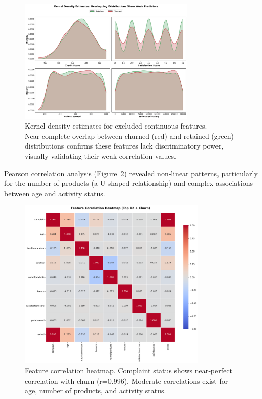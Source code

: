 \documentclass[12pt]{article}
\begin{document}
\begin{figure}[H]
\centering
\includegraphics[width=0.75\textwidth]{img/poc_kde_plots.png}
\caption{Kernel density estimates for excluded continuous features. Near‑complete overlap between churned (red) and retained (green) distributions confirms these features lack discriminatory power, visually validating their weak correlation values.}
\label{fig:kde_weak}
\end{figure}

Pearson correlation analysis (Figure~\ref{fig:correlation}) revealed non‑linear patterns, particularly for the number of products (a U‑shaped relationship) and complex associations between age and activity status.

\begin{figure}[H]
\centering
\includegraphics[width=0.8\textwidth]{img/08_correlation_heatmap.png}
\caption{Feature correlation heatmap. Complaint status shows near‑perfect correlation with churn (r=0.996). Moderate correlations exist for age, number of products, and activity status.}
\label{fig:correlation}
\end{figure}
\end{document}
